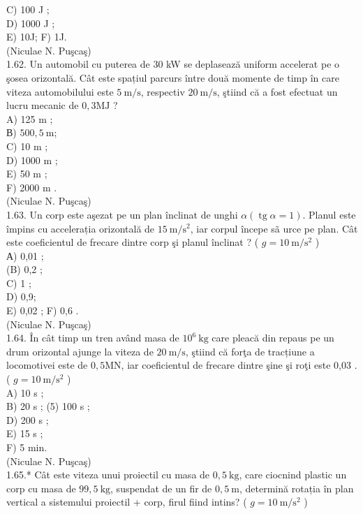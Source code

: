 \documentclass[10pt]{article}
\begin{document}
C) 100 J ;\\
D) 1000 J ;\\
E) 10J; F) 1J.\\
(Niculae N. Puşcaş)\\
1.62. Un automobil cu puterea de 30 kW se deplasează uniform accelerat pe o şosea orizontală. Cât este spațiul parcurs între două momente de timp în care viteza automobilului este $5 \mathrm{~m} / \mathrm{s}$, respectiv $20 \mathrm{~m} / \mathrm{s}$, ştiind că a fost efectuat un lucru mecanic de $0,3 \mathrm{MJ}$ ?\\
A) 125 m ;\\
В) $500,5 \mathrm{~m}$;\\
C) 10 m ;\\
D) 1000 m ;\\
E) 50 m ;\\
F) 2000 m .\\
(Niculae N. Puşcaş)\\
1.63. Un corp este aşezat pe un plan înclinat de unghi $\alpha(\operatorname{tg} \alpha=1)$. Planul este împins cu accelerația orizontală de $15 \mathrm{~m} / \mathrm{s}^{2}$, iar corpul începe sã urce pe plan. Cât este coeficientul de frecare dintre corp şi planul înclinat ? ( $g=10 \mathrm{~m} / \mathrm{s}^{2}$ )\\
А) 0,01 ;\\
(B) 0,2 ;\\
C) 1 ;\\
D) 0,9;\\
E) 0,02 ; F) 0,6 .\\
(Niculae N. Puşcaş)\\
1.64. În cât timp un tren având masa de $10^{6} \mathrm{~kg}$ care pleacă din repaus pe un drum orizontal ajunge la viteza de $20 \mathrm{~m} / \mathrm{s}$, ştiind că forţa de tracțiune a locomotivei este de $0,5 \mathrm{MN}$, iar coeficientul de frecare dintre şine şi roţi este 0,03 . ( $g=10 \mathrm{~m} / \mathrm{s}^{2}$ )\\
A) 10 s ;\\
B) 20 s ; (5) 100 s ;\\
D) 200 s ;\\
E) 15 s ;\\
F) 5 min.\\
(Niculae N. Puşcaş)\\
1.65.* Cât este viteza unui proiectil cu masa de $0,5 \mathrm{~kg}$, care ciocnind plastic un corp cu masa de $99,5 \mathrm{~kg}$, suspendat de un fir de $0,5 \mathrm{~m}$, determină rotația în plan vertical a sistemului proiectil + corp, firul fiind intins? ( $g=10 \mathrm{~m} / \mathrm{s}^{2}$ )\\
\end{document}
